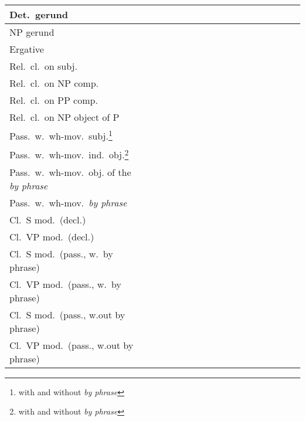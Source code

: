 \begin{center}
\begin{tabular}{|p{2.2in}||*{17}{c|}}
\hline
Det.\ gerund & & & & & & & & & & & & & & & & \\
\hline
NP gerund & & & & & & & & & & & & & & & & \\
\hline
Ergative & & & & & & & & & & & & & & & & \\
\hline
Rel.\ cl.\ on subj. & & & & & & & & & & & & & & & & \\
\hline
Rel.\ cl.\ on NP comp. & & & & & & & & & & & & & & & & \\
\hline
Rel.\ cl.\ on PP comp. & & & & & & & & & & & & & & & & \\
\hline
Rel.\ cl.\ on NP object of P & & & & & & & & & & & & & & & & \\
\hline
Pass.\ w.\ wh-mov.\ subj.\footnote{with and without {\it by phrase}} & & & & & & & & & & & & & & & & \\
\hline
Pass.\ w.\ wh-mov.\ ind.\ obj.\footnote{with and without {\it by phrase}} & & & & & & & & & & & & & & & & \\
\hline
Pass.\ w.\ wh-mov.\ obj. of the {\it by phrase} & & & & & & & & & & & & & & & & \\
\hline
Pass.\ w.\ wh-mov.\ {\it by phrase} & & & & & & & & & & & & & & & & \\
\hline
Cl.\ S mod.\ (decl.) & & & & & & & & & & & & & & & & \\
\hline
Cl.\ VP mod.\ (decl.) & & & & & & & & & & & & & & & & \\
\hline
Cl.\ S mod.\ (pass., w.\ by phrase) & & & & & & & & & & & & & & & & \\
\hline
Cl.\ VP mod.\ (pass., w.\ by phrase) & & & & & & & & & & & & & & & & \\
\hline
Cl.\ S mod.\ (pass., w.out by phrase) & & & & & & & & & & & & & & & & \\
\hline
Cl.\ VP mod.\ (pass., w.out by phrase) & & & & & & & & & & & & & & & & \\
\hline
\end{tabular}
\end{center}

\clearpage

\footnotesize

